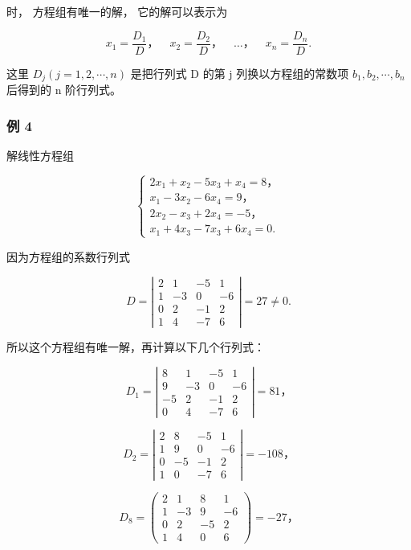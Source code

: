 时， 方程组有唯一的解， 它的解可以表示为

\[
x _ {1} = \frac {D _ {1}}{D}\text{，} \quad x _ {2} = \frac {D _ {2}}{D}\text{，} \quad \dots \text{，} \quad x _ {n} = \frac {D _ {n}}{D}.
\]

这里 \(D_{j}(j=1,2,\cdots,n)\) 是把行列式 D 的第 j 列换以方程组的常数项
\(b_{1}, b_{2}, \cdots, b_{n}\) 后得到的 n 阶行列式。

\subsubsection{例 4}

解线性方程组

\[
\left\{ \begin{array}{l} 2 x _ {1} + x _ {2} - 5 x _ {3} + x _ {4} = 8\text{，} \\ x _ {1} - 3 x _ {2} - 6 x _ {4} = 9\text{，} \\ 2 x _ {2} - x _ {3} + 2 x _ {4} = - 5\text{，} \\ x _ {1} + 4 x _ {3} - 7 x _ {3} + 6 x _ {4} = 0. \end{array} \right.
\]

 因为方程组的系数行列式

\[
D = \left| \begin{array}{cccc} 2 & 1 & - 5 & 1 \\ 1 & - 3 & 0 & - 6 \\ 0 & 2 & - 1 & 2 \\ 1 & 4 & - 7 & 6 \end{array} \right| = 27 \neq 0.
\]

所以这个方程组有唯一解，再计算以下几个行列式：

\[
D _ {1} = \left| \begin{array}{cccc} 8 & 1 & - 5 & 1 \\ 9 & - 3 & 0 & - 6 \\ - 5 & 2 & - 1 & 2 \\ 0 & 4 & - 7 & 6 \end{array} \right| = 81\text{，}
\]

\[
D _ {2} = \left| \begin{array}{cccc} 2 & 8 & - 5 & 1 \\ 1 & 9 & 0 & - 6 \\ 0 & - 5 & - 1 & 2 \\ 1 & 0 & - 7 & 6 \end{array} \right| = - 108\text{，}
\]

\[
D _ {8} = \left( \begin{array}{cccc} 2 & 1 & 8 & 1 \\ 1 & - 3 & 9 & - 6 \\ 0 & 2 & - 5 & 2 \\ 1 & 4 & 0 & 6 \end{array} \right) = - 27\text{，}
\]

